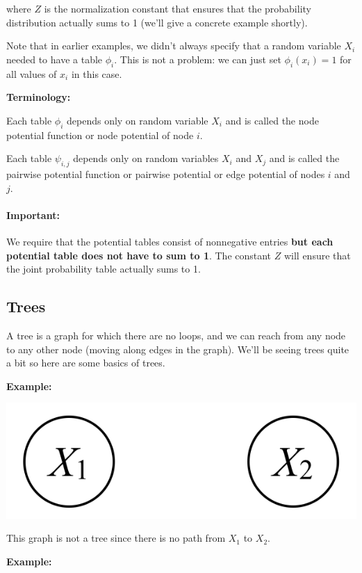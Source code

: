 \documentclass[6008notes.tex]{subfiles}
\begin{document}
where $Z$ is the normalization constant that ensures that the probability distribution actually sums to 1 (we'll give a concrete example shortly).

Note that in earlier examples, we didn't always specify that a random variable $X_i$ needed to have a table $\phi_i$. This is not a problem: we can just set $\phi_i(x_i) = 1$ for all values of $x_i$ in this case.

\textbf{Terminology:}

Each table $\phi_i$ depends only on random variable $X_i$ and is called the node potential function or node potential of node $i$.

Each table $\psi_{i, j}$ depends only on random variables $X_i$ and $X_j$ and is called the pairwise potential function or pairwise potential or edge potential of nodes $i$ and $j$.

\paragraph{Important:} We require that the potential tables consist of nonnegative entries \textbf{but each potential table does not have to sum to 1}. The constant $Z$ will ensure that the joint probability table actually sums to 1.


\subsection{Trees}

A tree is a graph for which there are no loops, and we can reach from any node to any other node (moving along edges in the graph). We'll be seeing trees quite a bit so here are some basics of trees.

\textbf{Example:}

{\centering\includegraphics[scale=0.4]{images_sec-graphical-models-2-rv-indep} \par}

This graph is not a tree since there is no path from $X_1$ to $X_2$.

\textbf{Example:}
\end{document}
